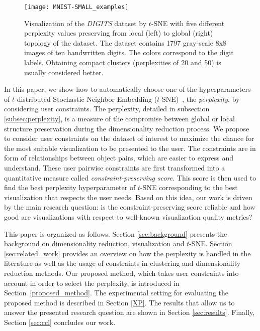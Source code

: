 \begin{figure*}
  \centering
  \texttt{[image: MNIST-SMALL\_examples]}
  \caption{Visualization of the \emph{DIGITS} dataset by $t$-SNE with five different perplexity values preserving from local (left) to global (right) topology of the dataset. The dataset contains 1797 gray-scale 8x8 images of ten handwritten digits. The colors correspond to the digit labels. Obtaining compact clusters (perplexities of 20 and 50) is usually considered better.}
  \label{fig:mnist_perps}
\end{figure*}

In this paper, we show how to automatically choose one of the hyperparameters of $t$-distributed Stochastic Neighbor Embedding ($t$-SNE)~\cite{maaten2008tsne}, the {\it perplexity}, by considering user constraints.
The perplexity, detailed in subsection \ref{subsec:perplexity}, is a measure of the compromise between global or local structure preservation during the dimensionality reduction process.
We propose to consider user constraints on the dataset of interest to maximize the chance for the most suitable visualization to be presented to the user.
The constraints are in form of relationships between object pairs, which are easier to express and understand.
These user pairwise constraints are first transformed into a quantitative measure called \emph{constraint-preserving score}.
This score is then used to find the best perplexity hyperparameter of $t$-SNE corresponding to the best visualization that respects the user needs.
Based on this idea, our work is driven by the main research question: is the constraint-preserving score reliable and how good are visualizations with respect to well-known visualization quality metrics?





This paper is organized as follows. Section \ref{sec:background} presents the background on dimensionality reduction, visualization and $t$-SNE. Section \ref{sec:related_work} provides an overview on how the perplexity is handled in the literature as well as the usage of constraints in clustering and dimensionality reduction methods.
Our proposed method, which takes user constraints into account in order to select the perplexity, is introduced in Section~\ref{proposed_method}. The experimental setting for evaluating the proposed method is described in Section \ref{XP}. The results that allow us to answer the presented research question are shown in Section \ref{sec:results}. Finally, Section \ref{sec:ccl} concludes our work.

